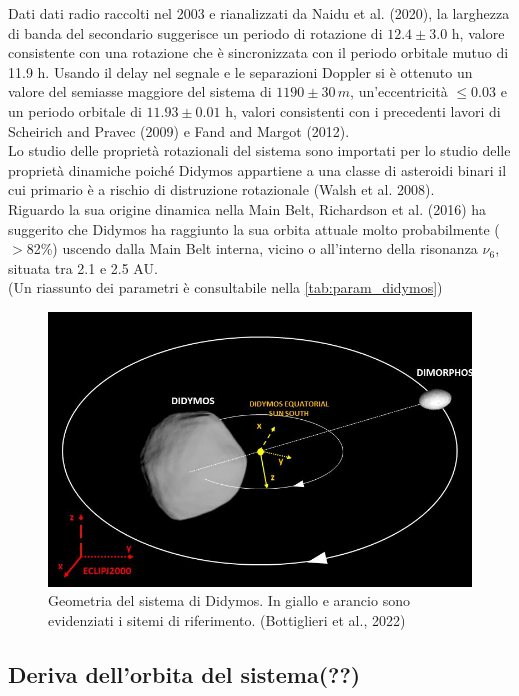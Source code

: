 \documentclass[a4paper,11pt,openright]{book}
\begin{document}
Dati dati radio raccolti nel 2003 e rianalizzati da Naidu et al. (2020), la larghezza di banda del secondario suggerisce un periodo di rotazione di $12.4\pm 3.0$ h, valore consistente con una rotazione che è sincronizzata con il periodo orbitale mutuo di 11.9 h. Usando il delay nel segnale e le separazioni Doppler si è ottenuto un valore del semiasse maggiore del sistema di $1190\pm 30\, m$, un'eccentricità $\leq 0.03$ e un periodo orbitale di $11.93\pm 0.01$ h, valori consistenti con i precedenti lavori di Scheirich and Pravec (2009) e Fand and Margot (2012).\\
Lo studio delle proprietà rotazionali del sistema sono importati per lo studio delle proprietà dinamiche poiché Didymos appartiene a una classe di asteroidi binari il cui primario è a rischio di distruzione rotazionale (Walsh et al. 2008).\\
Riguardo la sua origine dinamica nella Main Belt, Richardson et al. (2016) ha suggerito che Didymos ha raggiunto la sua orbita attuale molto probabilmente ($>$82\%) uscendo dalla Main Belt interna, vicino o all'interno della risonanza $\nu_6$, situata tra 2.1 e 2.5 AU. \\
(Un riassunto dei parametri è consultabile nella \cref{tab:param_didymos})

\begin{figure}[!h]
    \centering
    \includegraphics[scale=0.78]{figure/system_orbit.jpg}
    \caption{Geometria del sistema di Didymos. In giallo e arancio sono evidenziati i sitemi di riferimento. (Bottiglieri et al., 2022)}
    \label{fig:system_orbit}
\end{figure}

\subsection{Deriva dell'orbita del sistema(??)}
\end{document}
